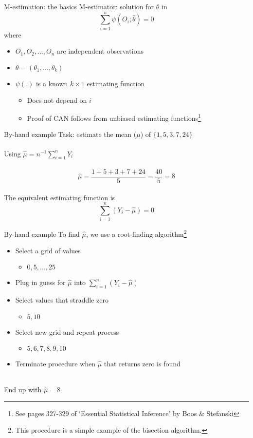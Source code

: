 \documentclass{beamer}
\begin{document}
\begin{frame}{M-estimation: the basics}
	M-estimator: solution for $\theta$ in
	\[ \sum_{i=1}^{n} \psi(O_i; \hat{\theta}) = 0 \]
	where 
	\begin{itemize}
		\item $O_1, O_2, ..., O_n$ are independent observations
		\item $\theta = (\theta_1, ..., \theta_k)$
		\item $\psi(.)$ is a known $k\times1$ estimating function
		\begin{itemize}
			\item Does not depend on $i$
			\item Proof of CAN follows from unbiased estimating functions\footnote[frame]{See pages 327-329 of `Essential Statistical Inference' by Boos \& Stefanski}
		\end{itemize}
	\end{itemize}
\end{frame}

\begin{frame}{By-hand example}
	Task: estimate the mean ($\mu$) of $\{1,5,3,7,24\}$
	\\~\\
	Using $\hat{\mu} = n^{-1} \sum_{i=1}^{n} Y_i$
	\\~\\
	$$\hat{\mu} = \frac{1+5+3+7+24}{5} = \frac{40}{5} = 8$$
	~\\
	The equivalent estimating function is
	$$\sum_{i=1}^{n} (Y_i - \hat{\mu}) = 0$$
\end{frame}

\begin{frame}{By-hand example}
	To find $\hat{\mu}$, we use a root-finding algorithm\footnote[frame]{This procedure is a simple example of the bisection algorithm.}
	\begin{itemize}
		\item Select a grid of values
		\begin{itemize}
			\item $0, 5, ..., 25$
		\end{itemize}
		\item Plug in guess for $\hat{\mu}$ into $\sum_{i=1}^{n} (Y_i - \hat{\mu})$
		\item Select values that straddle zero
		\begin{itemize}
			\item $5, 10$
		\end{itemize}
		\item Select new grid and repeat process
		\begin{itemize}
			\item $5, 6, 7, 8, 9, 10$
		\end{itemize}
		\item Terminate procedure when $\hat{\mu}$ that returns zero is found
	\end{itemize}~\\
	End up with $\hat{\mu} = 8$
\end{frame}
\end{document}
